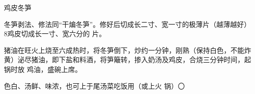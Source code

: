 \begin{recipe}{鸡皮冬笋}

\ingredients


\cooking

\step 冬笋剥法、修法同“干煸冬笋”。修好后切成长二寸、宽一寸的极薄片（越薄越好）
8鸡皮切成长一寸、宽六分的 片。

\step 猪油在旺火上烧至六成热时，将冬笋倒下，炒约一分钟，刚熟（保持白色，不能炸
黄）泌尽猪油，即下盐和料酒，将笋簸转，掺入奶汤及鸡皮，合烧三分钟时间，起锅时放
鸡油，盛碗上席。

\notes

色白、汤鲜、味浓，也可上于尾汤菜吃饭用（或上火 锅）〇

\end{recipe}

